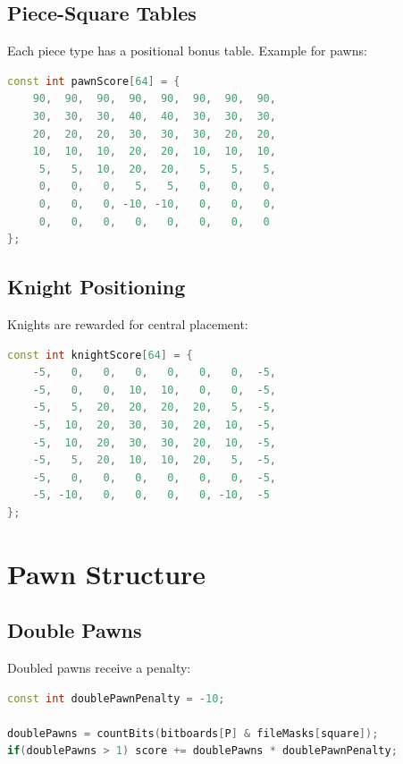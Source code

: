 \documentclass[11pt,a4paper]{report}
\begin{document}
\subsection{Piece-Square Tables}

Each piece type has a positional bonus table. Example for pawns:

\begin{lstlisting}[language=C++]
const int pawnScore[64] = {
    90,  90,  90,  90,  90,  90,  90,  90,
    30,  30,  30,  40,  40,  30,  30,  30,
    20,  20,  20,  30,  30,  30,  20,  20,
    10,  10,  10,  20,  20,  10,  10,  10,
     5,   5,  10,  20,  20,   5,   5,   5,
     0,   0,   0,   5,   5,   0,   0,   0,
     0,   0,   0, -10, -10,   0,   0,   0,
     0,   0,   0,   0,   0,   0,   0,   0
};
\end{lstlisting}

\subsection{Knight Positioning}

Knights are rewarded for central placement:

\begin{lstlisting}[language=C++]
const int knightScore[64] = {
    -5,   0,   0,   0,   0,   0,   0,  -5,
    -5,   0,   0,  10,  10,   0,   0,  -5,
    -5,   5,  20,  20,  20,  20,   5,  -5,
    -5,  10,  20,  30,  30,  20,  10,  -5,
    -5,  10,  20,  30,  30,  20,  10,  -5,
    -5,   5,  20,  10,  10,  20,   5,  -5,
    -5,   0,   0,   0,   0,   0,   0,  -5,
    -5, -10,   0,   0,   0,   0, -10,  -5
};
\end{lstlisting}

\section{Pawn Structure}

\subsection{Double Pawns}

Doubled pawns receive a penalty:

\begin{lstlisting}[language=C++]
const int doublePawnPenalty = -10;

doublePawns = countBits(bitboards[P] & fileMasks[square]);
if(doublePawns > 1) score += doublePawns * doublePawnPenalty;
\end{lstlisting}
\end{document}

